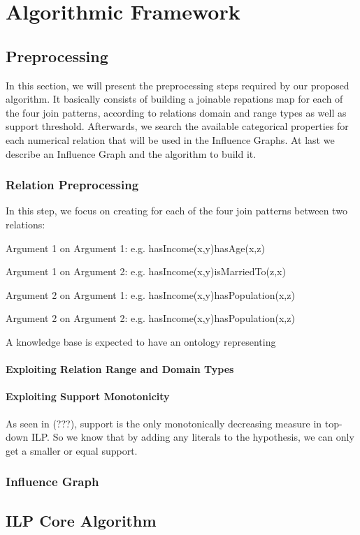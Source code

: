 \chapter{Algorithmic Framework}
\label{ch:intro}

\section{Preprocessing}

In this section, we will present the preprocessing steps required by our proposed algorithm. It basically consists of building a joinable repations map for each of the four join patterns, according to relations domain and range types as well as support threshold. Afterwards, we search the available categorical properties for each numerical relation that will be used in the Influence Graphs. At last we describe an Influence Graph and the algorithm to build it.

\subsection{Relation Preprocessing}

In this step, we focus on creating for each of the four join patterns between two relations:

\begin{itemset}
 \item Argument 1 on Argument 1: e.g. hasIncome(x,y)hasAge(x,z)
 \item Argument 1 on Argument 2: e.g. hasIncome(x,y)isMarriedTo(z,x)
 \item Argument 2 on Argument 1: e.g. hasIncome(x,y)hasPopulation(x,z)
 \item Argument 2 on Argument 2: e.g. hasIncome(x,y)hasPopulation(x,z)
\end{itemset}

A knowledge base is expected to have an ontology representing 

\subsubsection{Exploiting Relation Range and Domain Types}



\subsubsection{Exploiting Support Monotonicity}

As seen in (???), support is the only monotonically decreasing measure in top-down ILP. So we know that by adding any literals to the hypothesis, we can only get a smaller or equal support. 

\subsection{Influence Graph}

\section{ILP Core Algorithm}


